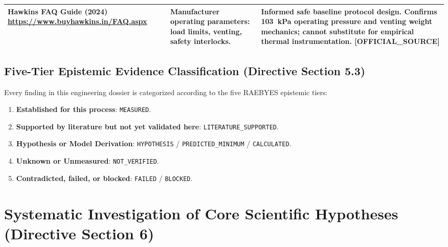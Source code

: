 \documentclass[10pt,a4paper]{article}
\newcommand{\epistag}[1]{\textsf{\scriptsize\textcolor{fnqslate}{[#1]}}}
\begin{document}
\begin{table}[H]
\begin{tabularx}{\linewidth}{p{3.2cm}p{4.2cm}>{\raggedright\arraybackslash}X}
Hawkins FAQ Guide (2024) \newline \url{https://www.buyhawkins.in/FAQ.aspx} & Manufacturer operating parameters: load limits, venting, safety interlocks. & Informed safe baseline protocol design. Confirms 103~kPa operating pressure and venting weight mechanics; cannot substitute for empirical thermal instrumentation. \epistag{OFFICIAL\_SOURCE} \\
\bottomrule
\end{tabularx}
\end{table}

\subsection{Five-Tier Epistemic Evidence Classification (Directive Section 5.3)}
Every finding in this engineering dossier is categorized according to the five RAEBYES epistemic tiers:
\begin{enumerate}[label=(\arabic*),leftmargin=0.8cm,noitemsep,topsep=2pt]
    \item \textbf{Established for this process}: \texttt{MEASURED}.
    \item \textbf{Supported by literature but not yet validated here}: \texttt{LITERATURE\_SUPPORTED}.
    \item \textbf{Hypothesis or Model Derivation}: \texttt{HYPOTHESIS} / \texttt{PREDICTED\_MINIMUM} / \texttt{CALCULATED}.
    \item \textbf{Unknown or Unmeasured}: \texttt{NOT\_VERIFIED}.
    \item \textbf{Contradicted, failed, or blocked}: \texttt{FAILED} / \texttt{BLOCKED}.
\end{enumerate}

\section{Systematic Investigation of Core Scientific Hypotheses (Directive Section 6)}
\end{document}
